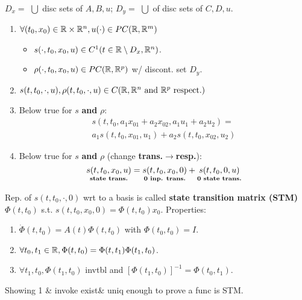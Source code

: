\begin{Theorem}
$D_x=$ $\bigcup$ disc sets of $A,B,u$; $D_y=$ $\bigcup$ of disc sets of $C,D,u$.
\begin{enumerate}
  \item $\forall (t_0,x_0)\in\mathbb R\times\mathbb R^n,u(\cdot)\in PC(\mathbb R,\mathbb R^m)$
  \begin{itemize}
    \item $s(\cdot,t_0,x_0,u)\in C^1(t\in\mathbb R\setminus D_x,\mathbb R^n)$.
    \item $\rho(\cdot,t_0,x_0,u)\in PC(\mathbb R,\mathbb R^p)$ w/ discont. set $D_y$.
  \end{itemize}
  \item $s(t,t_0,\cdot,u),\rho(t,t_0,\cdot,u)\in C(\mathbb R,\mathbb R^n\text{ and }\mathbb R^p\text{ respect.})$
  \item Below true for $s$ \textbf{and} $\rho$:
\begin{equation*}
\begin{matrix}
s(t,t_0,a_1x_{01}+a_2x_{02},a_1u_1+a_2u_2)= \\
a_1s(t,t_0,x_{01},u_1)+a_2s(t,t_0,x_{02},u_2)
\end{matrix}
\end{equation*}
  \item Below true for $s$ \textbf{and} $\rho$ (change \textbf{trans.}$\to$\textbf{resp.}):
  \begin{equation*}
  \underset{\substack{\text{\textbf{state trans.}}}}{s(t,t_0,x_0,u)}=\underset{\substack{\text{\textbf{0 inp. trans.}}}}{s(t,t_0,x_0,0)}+\underset{\substack{\text{\textbf{0 state trans.}}}}{s(t,t_0,0,u)}
  \end{equation*}
\end{enumerate}
\end{Theorem}
\begin{Definition}
Rep. of $s(t,t_0,\cdot,0)$ wrt to a basis is called \textbf{state transition matrix (STM)} $\Phi(t,t_0)$ s.t. $s(t,t_0,x_0,0)=\Phi(t,t_0)x_0$. Properties:
\begin{enumerate}
  \item $\dot\Phi(t,t_0)=A(t)\Phi(t,t_0)$ with $\Phi(t_0,t_0)=I$.
  \item $\forall t_0,t_1\in\mathbb R,\Phi(t,t_0)=\Phi(t,t_1)\Phi(t_1,t_0)$.
  \item $\forall t_1,t_0,\Phi(t_1,t_0)$ invtbl and $[\Phi(t_1,t_0)]^{-1}=\Phi(t_0,t_1)$.
\end{enumerate}
\end{Definition}
Showing 1 \& invoke exist\& uniq enough to prove a func is STM.

